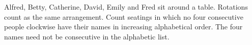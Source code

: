 Alfred, Betty, Catherine, David, Emily and Fred sit around a table. Rotations count as the same arrangement. Count seatings in which no four consecutive people clockwise have their names in increasing alphabetical order. The four names need not be consecutive in the alphabetic list.
